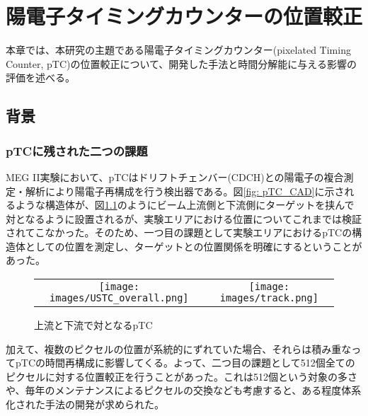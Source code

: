 \documentclass[Yonemoto_master.tex]{subfiles}
\begin{document}
\chapter{陽電子タイミングカウンターの位置較正}
本章では、本研究の主題である陽電子タイミングカウンター(pixelated Timing Counter, pTC)の位置較正について、開発した手法と時間分解能に与える影響の評価を述べる。

\section{背景}
\subsection{pTCに残された二つの課題}
MEG II実験において、pTCはドリフトチェンバー(CDCH)との陽電子の複合測定・解析により陽電子再構成を行う検出器である。図\ref{fig: pTC_CAD}に示されるような構造体が、図\ref{fig: double_pTC}のようにビーム上流側と下流側にターゲットを挟んで対となるように設置されるが、実験エリアにおける位置についてこれまでは検証されてこなかった。そのため、一つ目の課題として実験エリアにおけるpTCの構造体としての位置を測定し、ターゲットとの位置関係を明確にするということがあった。

\begin{figure}[h]
    \begin{tabular}{cc}
      \begin{minipage}[t]{0.45\hsize}
        \centering
        \texttt{[image: images/USTC\_overall.png]}
        \caption{CADにおける上流側pTCの概観}
        \label{fig: pTC_CAD}
      \end{minipage} &
      \begin{minipage}[t]{0.45\hsize}
        \centering
        \texttt{[image: images/track.png]}
        \caption{上流と下流で対となるpTC}
        \label{fig: double_pTC}
      \end{minipage}
    \end{tabular}
  \end{figure}
加えて、複数のピクセルの位置が系統的にずれていた場合、それらは積み重なってpTCの時間再構成に影響してくる。よって、二つ目の課題として512個全てのピクセルに対する位置較正を行うことがあった。これは512個という対象の多さや、毎年のメンテナンスによるピクセルの交換なども考慮すると、ある程度体系化された手法の開発が求められた。
\end{document}
